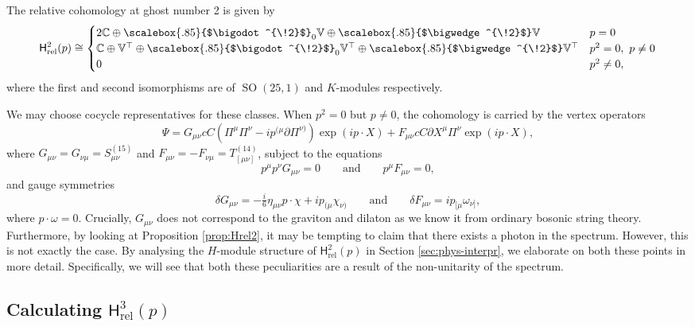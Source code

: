 \documentclass[11pt,reqno,a4paper,final]{amsart}
\newcommand\ext[1]{\scalebox{.85}{$\bigwedge^{\!#1}$}}
\newcommand\sym[1]{\scalebox{.85}{$\bigodot^{\!#1}$}}
\theoremstyle{plain}
\theoremstyle{definition}
\renewcommand{\d}{\partial}
\newcommand{\Hrel}{\mathsf{H}_{\mathrm{rel}}}
\newcommand{\VV}{\mathbb{V}}
\newcommand{\CC}{\mathbb{C}}
\newcommand{\1}{\mathbb{1}}
\newcommand{\SO}{\operatorname{SO}}
\numberwithin{equation}{section}
\begin{document}
The relative cohomology at ghost number 2 is given by
\begin{equation}
  \Hrel^2(p) \cong
  \begin{cases}
    2 \CC \oplus \sym{2}_0 \VV \oplus \ext{2} \VV & p = 0 \\
    \CC \oplus \VV^\top \oplus \sym{2}_0 \VV^\top \oplus \ext{2} \VV^\top & p^2=0,~p\neq 0\\
    0 & p^2 \neq 0,
  \end{cases}
\end{equation}
where the first and second isomorphisms are of $\SO(25,1)$ and $K$-modules respectively.

We may choose cocycle representatives for these classes.  When $p^2 = 0$ but $p \neq 0$, the
cohomology is carried by the vertex operators
\begin{equation}
  \label{eq:fields-H2rel}
  \Psi = G_{\mu\nu} c C \left( \Pi^\mu \Pi^\nu - i p^{(\mu} \d \Pi^{\nu)} \right) \exp(i p \cdot X) + F_{\mu\nu} c C \d X^\mu \Pi^\nu \exp(i p\cdot X),
\end{equation}
where $G_{\mu\nu} = G_{\nu\mu} = S^{(15)}_{\mu\nu}$ and $F_{\mu\nu} =
- F_{\nu\mu} = T^{(14)}_{[\mu\nu]}$, subject to the equations
\begin{equation}
  \label{eq:field-eqns-H2rel}
  p^\mu p^\nu G_{\mu\nu} = 0 \qquad\text{and}\qquad  p^\mu F_{\mu\nu}
  = 0,
\end{equation}
and gauge symmetries
\begin{equation}
  \label{eq:gauge-symmetries-Hrel2}
  \delta G_{\mu\nu} = -\tfrac i6 \eta_{\mu\nu} p \cdot \chi + i p_{(\mu} \chi_{\nu)}  \qquad\text{and}\qquad
  \delta F_{\mu\nu} = i p_{[\mu} \omega_{\nu]},
\end{equation}
where $p \cdot \omega = 0$.
Crucially, $G_{\mu\nu}$ does not correspond to the graviton and dilaton as we know it from ordinary bosonic string theory. Furthermore, by looking at Proposition \ref{prop:Hrel2}, it may be tempting to claim that there exists a photon in the spectrum. However, this is not exactly the case. By analysing the $H$-module structure of $\Hrel^2(p)$ in Section \ref{sec:phys-interpr}, we elaborate on both these points in more detail. Specifically, we will see that both these peculiarities are a result of the non-unitarity of the spectrum.

\subsection{Calculating $\Hrel^3(p)$}
\label{sec:calculating-hrel3p}
\end{document}
